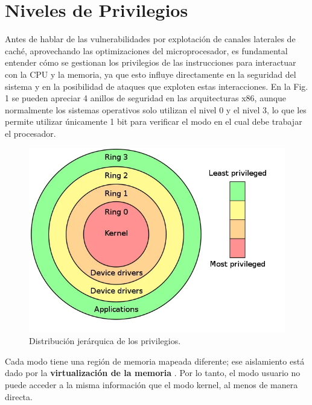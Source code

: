 \documentclass[lettersize,compsoc]{IEEEtran}
\begin{document}
\section{Niveles de Privilegios}
Antes de hablar de las vulnerabilidades por explotación de canales laterales de caché, aprovechando las optimizaciones del microprocesador, es fundamental entender cómo se gestionan los privilegios de las instrucciones para interactuar con la CPU y la memoria, ya que esto influye directamente en la seguridad del sistema y en la posibilidad de ataques que exploten estas interacciones.
\newline
En la Fig. 1 se pueden apreciar 4 anillos de seguridad en las arquitecturas x86, aunque normalmente los sistemas operativos solo utilizan el nivel 0 y el nivel 3, lo que les permite utilizar únicamente 1 bit para verificar el modo en el cual debe trabajar el procesador.
\begin{figure}[h]
  \centering
  \includegraphics[width=\linewidth]{rings.jpg}
  \caption{\small Distribución jerárquica de los privilegios.}
  \label{fig:etiqueta}
\end{figure}
\newline
Cada modo tiene una región de memoria mapeada diferente; ese aislamiento está dado por la \textbf{virtualización de la memoria} \cite{Virtualizacion}. Por lo tanto, el modo usuario no puede acceder a la misma información que el modo kernel, al menos de manera directa.
\end{document}
